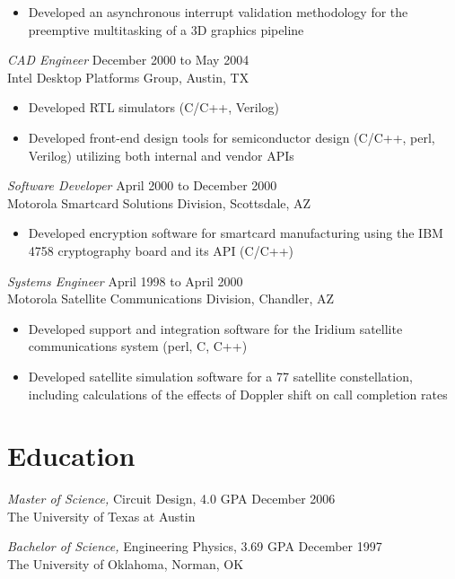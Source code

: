 \documentclass[overlapped]{res}
\begin{document}
\begin{resume}
\begin{itemize}
	\item Developed an asynchronous interrupt validation methodology for the preemptive multitasking of a 3D graphics pipeline
\end{itemize}
{\sl CAD Engineer} \hfill December 2000 to May 2004 \\
	Intel Desktop Platforms Group, Austin, TX
\begin{itemize}
	\item Developed RTL simulators (C/C++, Verilog)
	\item Developed front-end design tools for semiconductor design (C/C++, perl, Verilog) utilizing both internal and vendor APIs
\end{itemize}
{\sl Software Developer} \hfill April 2000 to December 2000 \\
	Motorola Smartcard Solutions Division, Scottsdale, AZ
\begin{itemize}
	\item Developed encryption software for smartcard manufacturing using the IBM 4758 cryptography board and its API (C/C++)
\end{itemize}
{\sl Systems Engineer} \hfill April 1998 to April 2000 \\
	Motorola Satellite Communications Division, Chandler, AZ
\begin{itemize}
	\item Developed support and integration software for the Iridium satellite communications system (perl, C, C++)
	\item Developed satellite simulation software for a 77 satellite constellation, including calculations of the effects of Doppler shift on call completion rates
\end{itemize}
\section{Education} 
{\sl Master of Science,} Circuit Design, 4.0 GPA \hfill December 2006\\
                The University of Texas at Austin                 

{\sl Bachelor of Science,} Engineering Physics, 3.69 GPA \hfill December 1997\\
                The University of Oklahoma, Norman, OK\\
\end{resume}
\end{document}
